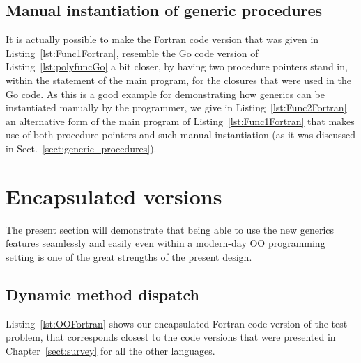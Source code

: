 \documentclass[11pt,oneside]{report}
\newcommand{\code}[1]{{\selectfont\ttfamily{#1}}}
\begin{document}
\subsection{Manual instantiation of generic procedures}

It is actually possible to make the Fortran code version that was
given in Listing~\ref{lst:Func1Fortran}, resemble the Go code version
of Listing~\ref{lst:polyfuncGo} a bit closer, by having two procedure
pointers stand in, within the \code{select case} statement of the main
program, for the closures that were used in the Go code. As this is a
good example for demonstrating how generics can be instantiated
manually by the programmer, we give in Listing~\ref{lst:Func2Fortran}
an alternative form of the main program of
Listing~\ref{lst:Func1Fortran} that makes use of both procedure
pointers and such manual instantiation (as it was discussed in
Sect.~\ref{sect:generic_procedures}).





\section{Encapsulated versions}

The present section will demonstrate that being able to use the new
generics features seamlessly and easily even within a modern-day OO
programming setting is one of the great strengths of the present
design.

\subsection{Dynamic method dispatch}
\label{sect:Fortran_dynamic_dispatch}

Listing~\ref{lst:OOFortran} shows our encapsulated Fortran code
version of the test problem, that corresponds closest to the code
versions that were presented in Chapter~\ref{sect:survey} for all the
other languages.
\end{document}
